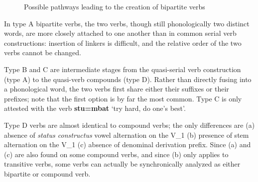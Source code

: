 \documentclass[oneside,a4paper,11pt]{article}
\newcommand{\ipa}[1]{{\phon\textbf{#1}}}
\newcommand{\jpg}[2]{\ipa{#1} `#2'}
\begin{document}
   \begin{figure}[H]
   \caption{Possible pathways leading to the creation of bipartite verbs} \label{fig:bipartite.pathways}  
\end{figure}

In type A bipartite verbs, the two verbs, though still phonologically two distinct words, are more closely attached to one another than in common serial verb constructions: insertion of linkers is difficult, and the relative order of the two verbs cannot be changed.

Type B and C are intermediate stages from the quasi-serial verb construction (type A) to the quasi-verb compounds (type D). Rather than directly fusing into a phonological word, the two verbs first share either their suffixes or their prefixes; note that the first option is by far the most common. Type C is only attested with the verb \jpg{stu=mbat}{try hard, do one's best}.

Type D verbs are almost identical to compound verbs; the only differences are (a)  absence of \textit{status constructus} vowel alternation on the V_1 (b) presence of stem alternation on the V_1 (c) absence of denominal derivation prefix. Since (a) and (c) are also found on some compound verbs, and since (b) only applies to transitive verbs, some verbs can actually be synchronically analyzed as either bipartite or compound verb.
\end{document}
